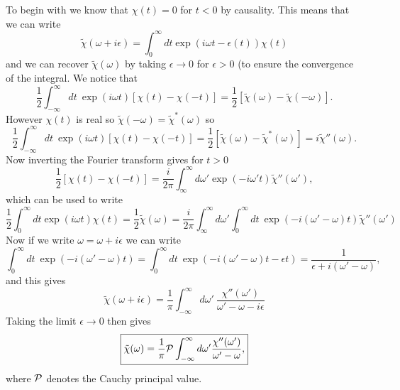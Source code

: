\documentclass[11pt]{report}
\begin{document}
To begin with we know that $\chi(t) =0$ for $t<0$ by causality. This means that we can write
\begin{equation}
\tilde\chi(\omega+i\epsilon) = \int_0^\infty dt \exp(i\omega t-\epsilon(t)) \chi(t)
\end{equation}
 and we can recover $\tilde \chi(\omega)$ by taking $\epsilon \to 0$ for $\epsilon>0$ (to ensure the convergence of the integral. We notice that
 \begin{equation}
 \frac{1}{2} \int_{-\infty}^\infty dt\ \exp(i\omega t) [\chi(t) -\chi(-t)] = \frac{1}{2}[\tilde \chi(\omega)
 -\tilde \chi(-\omega)].
 \end{equation}
 However $\chi(t)$ is real so $\tilde \chi(-\omega)=\tilde\chi^*(\omega)$ so
 \begin{equation}
 \frac{1}{2} \int_{-\infty}^\infty dt\ \exp(i\omega t) [\chi(t) -\chi(-t)] = \frac{1}{2}[\tilde \chi(\omega)
 -\tilde \chi^*(\omega)] = i \tilde\chi''(\omega).
 \end{equation}
 Now inverting the Fourier transform gives for $t>0$
 \begin{equation}
 \frac{1}{2}[\chi(t) -\chi(-t)] = \frac{i}{2\pi}\int_\infty^\infty d\omega' \exp(-i\omega't) \tilde\chi''(\omega'),
 \end{equation}
  which can be used to write
 \begin{equation}
  \frac{1}{2}\int_0^\infty dt \exp(i\omega t) \chi(t) =  \frac{1}{2} \tilde\chi(\omega)
  =  \frac{i}{2\pi}\int_\infty^\infty d\omega' \int_0^\infty dt\ \exp\left(-i(\omega'-\omega)t\right) \tilde \chi''(\omega')
 \end{equation}
 Now if we write $\omega = \omega + i\epsilon$ we can write
 \begin{equation}
 \int_0^\infty dt\ \exp\left(-i(\omega'-\omega)t\right) = \int_0^\infty dt\ \exp\left(-i(\omega'-\omega)t -\epsilon t\right) = \frac{1}{\epsilon + i(\omega'-\omega)},
 \end{equation} 
  and this gives
 \begin{equation}
 \tilde \chi(\omega+i\epsilon) = \frac{1}{\pi}\int_{-\infty}^{\infty} d\omega' \ \frac{\chi''(\omega')}{\omega'-\omega - i\epsilon}
 \end{equation}
 Taking the limit $\epsilon\to 0$ then gives
 \begin{equation}
 \boxed{
 \tilde \chi(\omega) = \frac{1}{\pi}{\cal P} \int_{-\infty}^{\infty} d\omega' \frac{\chi''(\omega')}{\omega'-\omega},}
 \end{equation}
 where ${\cal P}$ denotes the Cauchy principal value.
 
\end{document}
